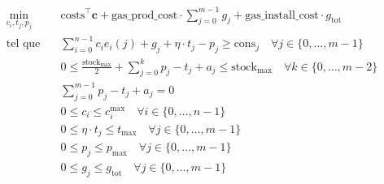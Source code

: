 \documentclass{article}
\begin{document}
\begin{align}
    \min_{c_{i},t_j,p_j} \quad &\mathrm{costs}^\intercal\mathbf{c} + \mathrm{gas\_prod\_cost}\cdot \sum_{j=0}^{m-1} g_j + \mathrm{gas\_install\_cost} \cdot g_\mathrm{tot}\nonumber\\
    \textrm{tel que} \quad & \sum_{i=0}^{n-1} c_i e_i(j) + g_j + \eta \cdot t_j - p_j \ge \mathrm{cons}_j \quad \forall j \in  \{ 0, \ldots, m-1 \}\label{eq:6_contr1}\\
    & 0 \le \frac{\mathrm{stock}_\mathrm{max}}{2}  + \sum_{j=0}^{k} p_j - t_j + a_j \le  \mathrm{stock}_\mathrm{max} \quad \forall k \in \{ 0, \ldots, m-2 \}\label{eq:6_contr2}\\
    & \sum_{j=0}^{m-1} p_j - t_j + a_j = 0 \label{eq:6_contr3}\\
    & 0 \le c_i \le c_i^\mathrm{max} \quad \forall i \in  \{ 0, \ldots, n-1 \}  \label{eq:6_contr4}\\
    & 0 \le \eta \cdot t_j \le  t_\mathrm{max} \quad \forall j \in  \{ 0, \ldots, m-1 \}  \label{eq:6_contr5}\\
    & 0 \le p_j \le  p_\mathrm{max} \quad \forall j \in  \{ 0, \ldots, m-1 \} \label{eq:6_contr6}\\
    & 0 \le g_j \le g_\mathrm{tot} \quad \forall j \in  \{ 0, \ldots, m-1 \} \label{eq:6_contr7}
\end{align}
\end{document}
